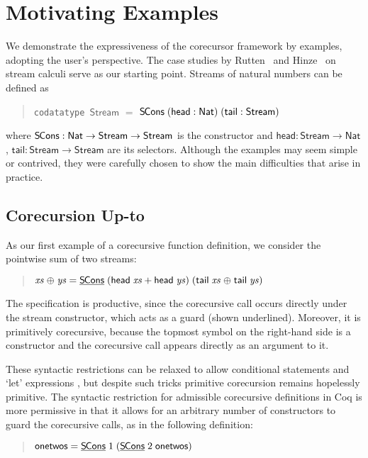 \documentclass[preprint,draft]
{sigplanconf}
\newcommand\TC{\mathsf}
\newcommand\keyw[1]{\texttt{#1}}
\newcommand{\ra}{\rightarrow}
\newcommand{\<}{\langle}
\renewcommand{\>}{\rangle}
\newcommand{\onetwos}{{{\mathsf{onetwos}}}}
\newcommand{\hd}{{{\mathsf{head}}}}
\newcommand{\tl}{{{\mathsf{tail}}}}
\newcommand{\SCons}{{{\mathsf{S\hspace*{-0.2ex}Cons}}}}
\newcommand{\opls}{\mathrel\oplus}
\newcommand{\GUARD}[1]{{{\underline{#1}}}}
\newcommand{\xs}{{\mathit{xs}}}
\newcommand{\ys}{{\mathit{ys}}}
\newcommand\Stream{\TC{Stream}}
\newcommand\Nat{{\TC{Nat}}}
\begin{document}
\section{Motivating Examples}
\label{sec-exa}







We demonstrate the expressiveness of the corecursor framework by
examples, adopting the user's perspective. The case studies by
Rutten~\cite{rutten05} and Hinze~\cite{hinze10} on stream calculi serve as
our starting point. Streams of natural numbers can be defined as
\begin{quote}
  \keyw{codatatype} \,$\Stream$ $=$ $\SCons\;(\hd: \Nat)\;(\tl: \Stream)$
\end{quote}
where $\SCons : \Nat
\ra \Stream \ra \Stream$ is the constructor and $\hd : \Stream \ra \Nat$, $\tl :
\Stream \ra \Stream$ are its selectors.
Although the examples may seem simple or contrived, they were carefully
chosen to show the main difficulties that arise in practice.

\subsection{Corecursion Up-to}
\label{sec-uptoExa}

As our first example of a corecursive function definition,
we consider the pointwise sum of two streams:
\begin{quote}
  $\xs \opls \ys  =  \GUARD{\SCons}\;(\hd\;\xs + \hd\;\ys)\;(\tl\;\xs \opls
  \tl\;\ys)$
\end{quote}
The specification is productive, since the corecursive call occurs directly
under the stream constructor, which acts as a guard (shown underlined).
Moreover, it is primitively corecursive, because the topmost symbol on the
right-hand side is a constructor and the corecursive call
appears directly as an argument to it.

These syntactic restrictions can be relaxed to allow conditional statements
and `let' expressions \cite{blanchette-et-al-2014-impl}, but despite
such tricks primitive corecursion remains hopelessly primitive.
The syntactic restriction for admissible corecursive definitions in Coq is more
permissive in that it allows for an arbitrary number of constructors to guard
the corecursive calls, as in the following definition:
\begin{quote}
$\onetwos  =  \GUARD{\SCons}\;1\;(\GUARD{\SCons}\;2\;\onetwos)$
\end{quote}
\end{document}
